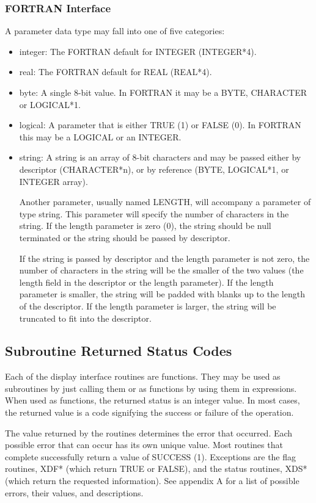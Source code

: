 \subsubsection{FORTRAN Interface}
A parameter data type may fall into one of five categories:
\begin{itemize}
\item integer:	The FORTRAN default for INTEGER (INTEGER*4).
\item real:	The FORTRAN default for REAL (REAL*4).
\item byte:	A single 8-bit value.  In FORTRAN it may be a BYTE,
CHARACTER or LOGICAL*1.
\item logical:	A parameter that is either TRUE (1) or FALSE (0).
In FORTRAN this may be a LOGICAL or an INTEGER.
\item string:	A string is an array of 8-bit characters and
may be passed either by descriptor (CHARACTER*n), or by
reference (BYTE, LOGICAL*1, or INTEGER array).

Another parameter, usually named LENGTH, will accompany a parameter
of type string.  This parameter will specify the number of characters
in the string.  If the length parameter is zero (0), the string should
be null terminated or the string should be passed by descriptor.

If the string is passed by descriptor and the length parameter is
not zero, the number of characters in the string will be the
smaller of the two values (the length field in the descriptor or
the length parameter).  If the length parameter is smaller, the
string will be padded with blanks up to the length of the descriptor.
If the length parameter is larger, the string will be truncated to
fit into the descriptor.
\end{itemize}
\subsection{Subroutine Returned Status Codes}
Each of the display interface routines are functions.  They may be
used as subroutines by just calling them or as functions by using
them in expressions.  When used as functions, the returned status 
is an integer value.  In most cases, the returned value is a code
signifying the success or failure of the operation.

The value returned by the routines determines the error that
occurred.  Each possible error that can occur has its own unique
value.  Most routines that complete successfully return a value of
SUCCESS (1).  Exceptions are the flag routines, XDF* (which return TRUE
or FALSE), and the status routines, XDS* (which return the requested
information).  See appendix A for a list of possible errors, their
values, and descriptions.

